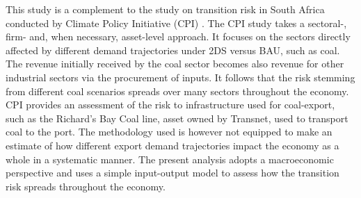 \documentclass[12pt,english]{article}
\begin{document}

This study is a complement to the study on transition risk in South Africa conducted by Climate Policy Initiative (CPI) .
The CPI study takes a sectoral-, firm- and, when necessary, asset-level approach. %
It focuses on the sectors directly affected by different demand trajectories under 2DS versus BAU, such as coal. The revenue initially received by the coal sector becomes also revenue for other industrial sectors via the procurement of inputs. It follows that the risk stemming from different coal scenarios spreads over many sectors throughout the economy. CPI provides an assessment of the risk to infrastructure used for coal-export, such as the Richard's Bay Coal line, asset owned by Transnet, used to transport coal to the port. The methodology used is however not equipped to make an estimate of how different export demand trajectories impact the economy as a whole in a systematic manner. The present analysis adopts a macroeconomic perspective and uses a simple input-output model to assess how the transition risk spreads throughout the economy. %
\end{document}
